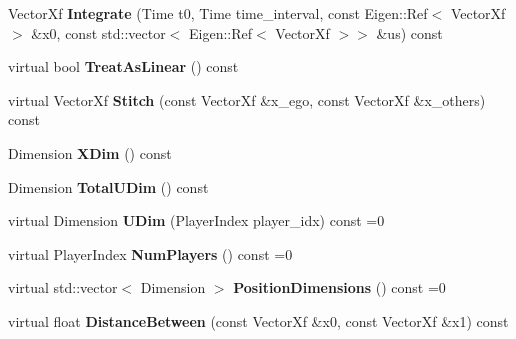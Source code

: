 \begin{DoxyCompactItemize}
\item 
Vector\+Xf {\bfseries Integrate} (Time t0, Time time\+\_\+interval, const Eigen\+::\+Ref$<$ Vector\+Xf $>$ \&x0, const std\+::vector$<$ Eigen\+::\+Ref$<$ Vector\+Xf $>$$>$ \&us) const \hypertarget{classilqgames_1_1_multi_player_integrable_system_afa891d5a1184cefdc316f76528d01a0e}{}\label{classilqgames_1_1_multi_player_integrable_system_afa891d5a1184cefdc316f76528d01a0e}

\item 
virtual bool {\bfseries Treat\+As\+Linear} () const \hypertarget{classilqgames_1_1_multi_player_integrable_system_adf8ab89fd04892a1806814ef4ce89188}{}\label{classilqgames_1_1_multi_player_integrable_system_adf8ab89fd04892a1806814ef4ce89188}

\item 
virtual Vector\+Xf {\bfseries Stitch} (const Vector\+Xf \&x\+\_\+ego, const Vector\+Xf \&x\+\_\+others) const \hypertarget{classilqgames_1_1_multi_player_integrable_system_a027ab5dea23c68ea74040a50a7b16c31}{}\label{classilqgames_1_1_multi_player_integrable_system_a027ab5dea23c68ea74040a50a7b16c31}

\item 
Dimension {\bfseries X\+Dim} () const \hypertarget{classilqgames_1_1_multi_player_integrable_system_a1f3d72304e04f6906e6e1066717411a7}{}\label{classilqgames_1_1_multi_player_integrable_system_a1f3d72304e04f6906e6e1066717411a7}

\item 
Dimension {\bfseries Total\+U\+Dim} () const \hypertarget{classilqgames_1_1_multi_player_integrable_system_ac6fc71106bffdff776a55792af4560d1}{}\label{classilqgames_1_1_multi_player_integrable_system_ac6fc71106bffdff776a55792af4560d1}

\item 
virtual Dimension {\bfseries U\+Dim} (Player\+Index player\+\_\+idx) const =0\hypertarget{classilqgames_1_1_multi_player_integrable_system_a89563d59d8cda88e0825992b86c9a146}{}\label{classilqgames_1_1_multi_player_integrable_system_a89563d59d8cda88e0825992b86c9a146}

\item 
virtual Player\+Index {\bfseries Num\+Players} () const =0\hypertarget{classilqgames_1_1_multi_player_integrable_system_a894daac1bf9f941718529e5a31b81a88}{}\label{classilqgames_1_1_multi_player_integrable_system_a894daac1bf9f941718529e5a31b81a88}

\item 
virtual std\+::vector$<$ Dimension $>$ {\bfseries Position\+Dimensions} () const =0\hypertarget{classilqgames_1_1_multi_player_integrable_system_aa997a26ebcf8aaa4ec80b22fa996d574}{}\label{classilqgames_1_1_multi_player_integrable_system_aa997a26ebcf8aaa4ec80b22fa996d574}

\item 
virtual float {\bfseries Distance\+Between} (const Vector\+Xf \&x0, const Vector\+Xf \&x1) const \hypertarget{classilqgames_1_1_multi_player_integrable_system_af25dee45970bc4e53a3844084bc3fad4}{}\label{classilqgames_1_1_multi_player_integrable_system_af25dee45970bc4e53a3844084bc3fad4}

\end{DoxyCompactItemize}
